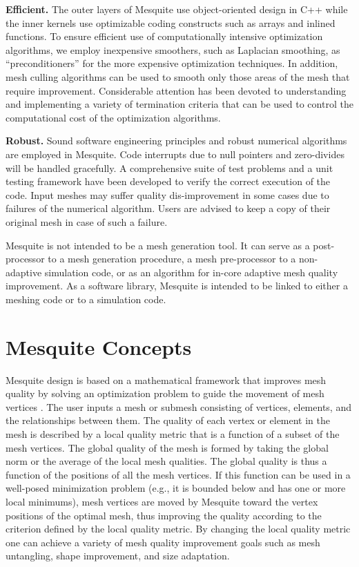 \documentclass[letter]{report}
\begin{document}
{\bf Efficient.}  The outer layers of Mesquite use 
object-oriented design in C++ while the inner kernels use
optimizable coding constructs such as arrays and inlined
functions.  To ensure efficient use of computationally intensive
optimization algorithms, we employ inexpensive smoothers, such as
Laplacian smoothing, as ``preconditioners'' for the more expensive
optimization techniques.  In addition, mesh culling algorithms can be
used to smooth only those areas of the mesh that require improvement.
Considerable attention has been devoted to understanding and
implementing a variety of termination criteria that can be used to
control the computational cost of the optimization algorithms. \newline

{\bf Robust.} Sound software engineering principles and robust numerical 
algorithms are employed in Mesquite. Code interrupts due to null pointers and 
zero-divides will be handled gracefully.  A
comprehensive suite of test problems and a unit testing framework have
been developed to verify the correct execution of the code. Input meshes
may suffer quality dis-improvement in some cases due to failures of the
numerical algorithm. Users are advised to keep a copy of their original
mesh in case of such a failure. \newline

Mesquite is not intended to be a mesh generation tool. It can serve as 
a post-processor to a mesh generation procedure, a mesh pre-processor to a 
non-adaptive simulation code, or as an algorithm for in-core adaptive mesh 
quality improvement. As a software library, Mesquite is intended to be
linked to either a meshing code or to a simulation code. \newline

\section{Mesquite Concepts}

Mesquite design is based on a mathematical 
framework that improves mesh quality by solving an optimization 
problem to guide the movement of mesh vertices \cite{formal}. 
The user inputs a mesh or 
submesh consisting of vertices, elements, and the relationships between them. 
The quality of each vertex or 
element in the mesh is described by a local quality metric that is a function 
of a subset of the mesh vertices. The global quality of the mesh is formed by 
taking the global norm or the average of the local mesh qualities. The global 
quality is thus a function of the positions of all the mesh vertices. If this 
function can be used in a well-posed minimization problem (e.g., it is 
bounded below and has one or more local minimums), mesh vertices are moved 
by Mesquite toward the vertex positions of the optimal mesh, thus improving 
the quality according to the criterion defined by the local quality metric. 
By changing the local quality metric one can achieve a variety of mesh quality improvement goals such as mesh untangling, shape improvement, and size adaptation. \newline
\end{document}
